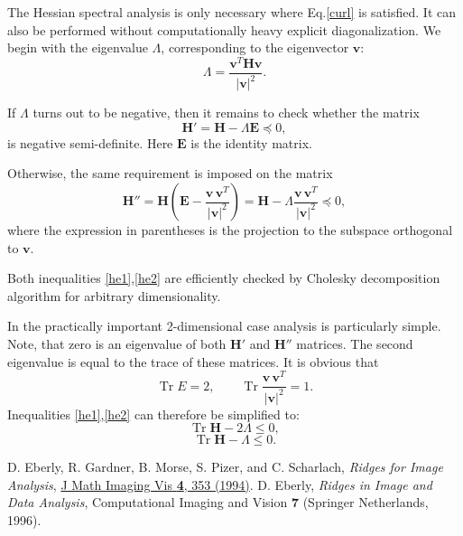 \documentclass{article}
\DeclareMathOperator{\Tr}{Tr}
\begin{document}
The Hessian spectral analysis is only necessary where Eq.\eqref{curl} is satisfied. It can also be performed without computationally heavy explicit diagonalization. We begin with the eigenvalue $\Lambda$, corresponding to the eigenvector $\mathbf{v}$:
\begin{equation}
\Lambda = \frac{\mathbf{v}^T\boldsymbol{H} \mathbf{v}}{\left|\mathbf{v}\right|^2}.
\end{equation}

If $\Lambda$ turns out to be negative, then it remains to check whether the matrix 
\begin{equation}
\label{he1}
\boldsymbol{H}' = \boldsymbol{H} -\Lambda \boldsymbol{E} \preceq 0,
\end{equation}
is negative semi-definite. Here $\boldsymbol{E}$ is the identity matrix. 

Otherwise, the same requirement is imposed on the matrix
\begin{equation}
\label{he2}
\boldsymbol{H}''=
\boldsymbol{H}\left(\boldsymbol{E} - \frac{\mathbf{v}\,\mathbf{v}^T}{\left|\mathbf{v}\right|^2}\right)=
\boldsymbol{H} - \Lambda \frac{\mathbf{v}\,\mathbf{v}^T}{\left|\mathbf{v}\right|^2}
\preceq 0,
\end{equation}
where the expression in parentheses is the projection to the subspace orthogonal to $\mathbf{v}$.

Both inequalities \eqref{he1},\eqref{he2} are efficiently checked by Cholesky decomposition algorithm for arbitrary dimensionality.

In the practically important 2-dimensional case analysis is particularly simple. Note, that zero is an eigenvalue of both $\boldsymbol{H}'$ and $\boldsymbol{H}''$ matrices. The second eigenvalue is equal to the trace of these matrices. It is obvious that
\begin{equation*}
\Tr E = 2, \qquad \Tr \frac{\mathbf{v}\,\mathbf{v}^T}{\left|\mathbf{v}\right|^2} = 1.
\end{equation*}
Inequalities \eqref{he1},\eqref{he2} can therefore be simplified to:
\begin{equation*}
\tag{$5^*$}
\Tr\boldsymbol{H} - 2\Lambda \leq 0,
\end{equation*}
\begin{equation*}
\tag{$6^*$}
\Tr \boldsymbol{H} - \Lambda \leq 0.
\end{equation*}



\begin{thebibliography}{9}
D. Eberly, R. Gardner, B. Morse, S. Pizer, and C. Scharlach,
\textit{Ridges for Image Analysis},
\href{https://doi.org/10.1007/BF01262402}{J Math Imaging Vis \textbf{4}, 353 (1994)}.
D. Eberly,
\textit{Ridges in Image and Data Analysis},
Computational Imaging and Vision \textbf{7} (Springer Netherlands, 1996).
\end{thebibliography}
\end{document}
